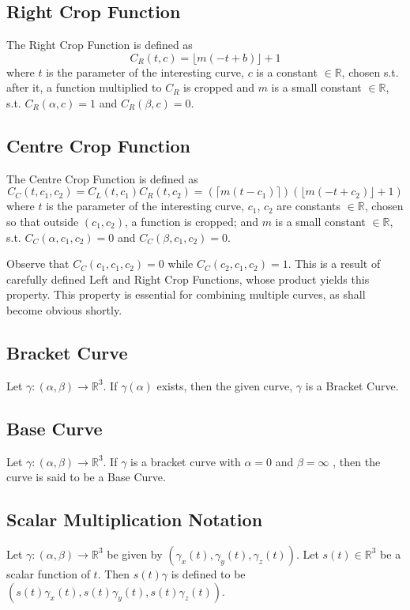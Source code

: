 		\subsection{Right Crop Function}
			The Right Crop Function is defined as
			\begin{equation}
				C_R(t,c) = \lfloor m (-t + b) \rfloor + 1
				\label{left}
			\end{equation}
			where $t$ is the parameter of the interesting curve, $c$ is a constant $\in \mathbb R$, chosen s.t. after it, a function multiplied to $C_R$ is cropped and $m$ is a small constant $\in \mathbb R$, s.t. $C_R(\alpha,c)=1$ and $C_R(\beta,c)=0$.

		\subsection{Centre Crop Function}
			The Centre Crop Function is defined as
			\begin{equation}
				C_C(t,c_1,c_2) = C_L(t,c_1)C_R(t,c_2) = (\lceil m (t - c_1) \rceil)(\lfloor m (-t + c_2) \rfloor + 1)
				\label{left}
			\end{equation}
			where $t$ is the parameter of the interesting curve, $c_1$, $c_2$ are constants $\in \mathbb R$, chosen so that outside $(c_1,c_2)$, a function is cropped; and $m$ is a small constant $\in \mathbb R$, s.t. $C_C(\alpha,c_1,c_2)=0$ and $C_C(\beta,c_1,c_2)=0$.
			\par
			Observe that $C_C(c_1,c_1,c_2)=0$ while $C_C(c_2,c_1,c_2)=1$. This is a result of carefully defined Left and Right Crop Functions, whose product yields this property. This property is essential for combining multiple curves, as shall become obvious shortly.

		\subsection{Bracket Curve}
			Let $\gamma: (\alpha,\beta) \rightarrow \mathbb R^3$. If $\gamma(\alpha)$ exists, then the given curve, $\gamma$ is a Bracket Curve.

		\subsection{Base Curve}
			Let $\gamma: (\alpha,\beta) \rightarrow \mathbb R^3$. If $\gamma$ is a bracket curve with $\alpha=0$ and $\beta=\infty$ , then the curve is said to be a Base Curve.

		\subsection{Scalar Multiplication Notation}
			Let $\gamma: (\alpha,\beta) \rightarrow \mathbb R^3$ be given by $(\gamma_x(t),\gamma_y(t),\gamma_z(t))$. Let $s(t) \in \mathbb R^3$ be a scalar function of $t$. Then $s(t)\gamma$ is defined to be\\
			$(s(t)\gamma_x(t),s(t)\gamma_y(t),s(t)\gamma_z(t))$.

